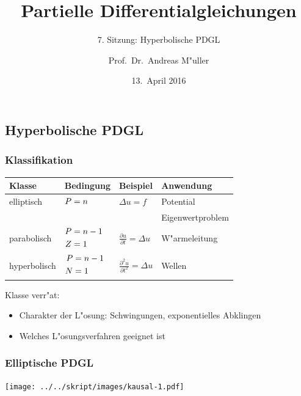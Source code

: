 \documentclass[handout]{beamer}
\title[]{Partielle Differentialgleichungen}
\subtitle{7. Sitzung: Hyperbolische PDGL}
\date[13.~April 2016]{13.~April 2016}
\author{Prof.~Dr.~Andreas M"uller}
\begin{document}
\begin{frame}
\section{Hyperbolische PDGL}
\titlepage

\end{frame}

\begin{frame}
\frametitle{Klassifikation}

\begin{center}
\begin{tabular}{llll}
Klasse&Bedingung&Beispiel&Anwendung\\
\hline
elliptisch &$\begin{aligned}P&=n\mathstrut\end{aligned}$
	&$\displaystyle \Delta u=f                                $
		&Potential\\
&	&	&Eigenwertproblem\\
\hline
parabolisch&%
$\begin{aligned}P&=n-1\mathstrut\\Z&=1\mathstrut\end{aligned}$
	&$\displaystyle \frac{\partial u}{\partial t}=\Delta u    $
		&W"armeleitung\\
\hline
hyperbolisch&%
$\begin{aligned}P&=n-1\mathstrut\\N&=1\mathstrut\end{aligned}$
	&$\displaystyle \frac{\partial^2 u}{\partial t^2}=\Delta u$
		&Wellen\\
\hline
\end{tabular}
\end{center}

Klasse verr"at:
\begin{itemize}
\item Charakter der L"osung: Schwingungen, exponentielles Abklingen
\item Welches L"osungsverfahren geeignet ist
\end{itemize}

\end{frame}

\begin{frame}
\frametitle{Elliptische PDGL}
\begin{center}
\texttt{[image: ../../skript/images/kausal-1.pdf]}
\end{center}
\end{frame}
\end{document}
